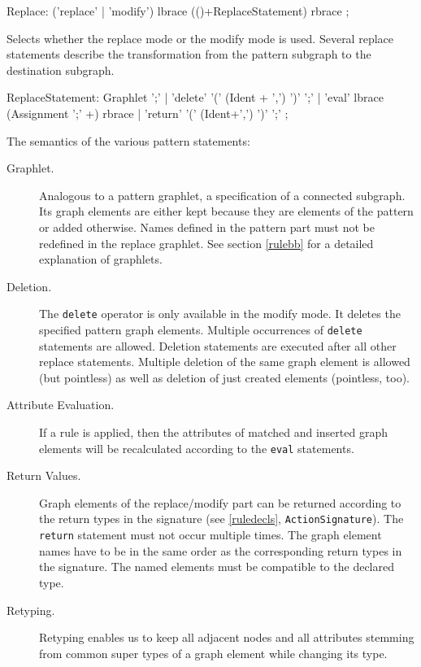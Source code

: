 \begin{rail}
  Replace: ('replace' | 'modify') lbrace (()+ReplaceStatement) rbrace ;
\end{rail}
Selects whether the replace mode or the modify mode is used. Several replace statements describe the transformation from the pattern subgraph to the destination subgraph.

\begin{rail}  
  ReplaceStatement: Graphlet ';' |
    'delete' '(' (Ident + ',') ')' ';' |
    'eval' lbrace (Assignment ';' +) rbrace |
    'return' '(' (Ident+',') ')' ';' ;
\end{rail}
The semantics of the various pattern statements:
\begin{description}
  \item[Graphlet.] Analogous to a pattern graphlet, a specification of a connected subgraph. Its graph elements are either kept because they are elements of the pattern or added otherwise. Names defined in the pattern part must not be redefined in the replace graphlet. See section \ref{rulebb} for a detailed explanation of graphlets. 
  \item[Deletion.] The \texttt{delete} operator is only available in the modify mode. It deletes the specified pattern graph elements. Multiple occurrences of \texttt{delete} statements are allowed. Deletion statements are executed after all other replace statements. Multiple deletion of the same graph element is allowed (but pointless) as well as deletion of just created elements (pointless, too).
  \item[Attribute Evaluation.] If a rule is applied, then the attributes of matched and inserted graph elements will be recalculated according to the \texttt{eval} statements.
  \item[Return Values.] Graph elements of the replace/modify part can be returned according to the return types in the signature (see \ref{ruledecls}, \texttt{ActionSignature}). The \texttt{return} statement must not occur multiple times. The graph element names have to be in the same order as the corresponding return types in the signature. The named elements must be compatible to the declared type.
  \item[Retyping.] Retyping enables us to keep all adjacent nodes and all attributes stemming from common super types of a graph element while changing its type. 

\end{description}
